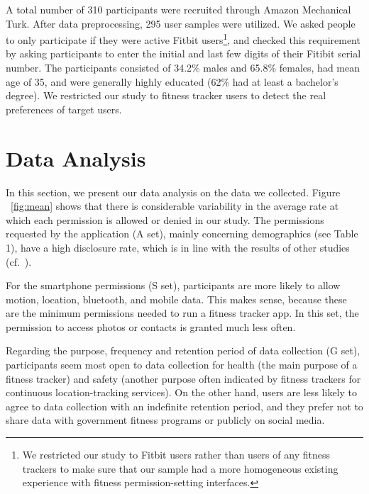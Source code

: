 A total number of 310 participants were recruited through Amazon Mechanical Turk. After data preprocessing, 295 user samples were utilized. We asked people to only participate if they were active Fitbit users\footnote{We restricted our study to Fitbit users rather than users of any fitness trackers to make sure that our sample had a more homogeneous existing experience with fitness permission-setting interfaces.}, and checked this requirement by asking participants to enter the initial and last few digits of their Fitibit serial number. The participants consisted  of 34.2\% males and 65.8\% females, had mean age of 35, and were generally highly educated (62\% had at least a bachelor's degree). We restricted our study to fitness tracker users to detect the real preferences of target users.

\section{Data Analysis}
In this section, we present our data analysis on the data we collected. Figure ~\ref{fig:mean} shows that there is considerable variability in the average rate at which each permission is allowed or denied in our study. The permissions requested by the application (A set), mainly concerning demographics (see Table 1), have a high disclosure rate, which is in line with the results of other studies (cf.~\cite{knijnenburg2013helping}).

For the smartphone permissions (S set), participants are more likely to allow motion, location, bluetooth, and mobile data. This makes sense, because these are the minimum permissions needed to run a fitness tracker app. In this set, the permission to access photos or contacts is granted much less often.

Regarding the purpose, frequency and retention period of data collection (G set), participants seem most open to data collection for health (the main purpose of a fitness tracker) and safety (another purpose often indicated by fitness trackers for continuous location-tracking services). On the other hand, users are less likely to agree to data collection with an indefinite retention period, and they prefer not to share data with government fitness programs or publicly on social media. 




%

